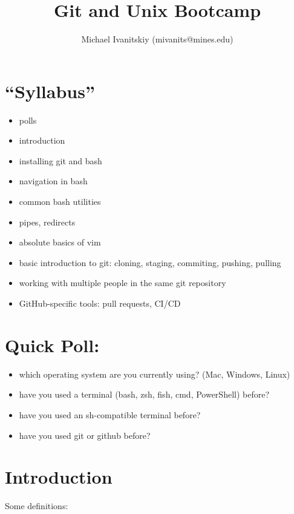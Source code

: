 \documentclass[
]{article}
\title{Git and Unix Bootcamp}
\author{Michael Ivanitskiy (mivanits@mines.edu)}
\date{}
\providecommand{\tightlist}{%
  \setlength{\itemsep}{0pt}\setlength{\parskip}{0pt}}
\begin{document}
\maketitle

\hypertarget{syllabus}{%
\section{``Syllabus''}\label{syllabus}}

\begin{itemize}
\tightlist
\item
  polls
\item
  introduction
\item
  installing git and bash
\item
  navigation in bash
\item
  common bash utilities
\item
  pipes, redirects
\item
  absolute basics of vim
\item
  basic introduction to git: cloning, staging, commiting, pushing,
  pulling
\item
  working with multiple people in the same git repository
\item
  GitHub-specific tools: pull requests, CI/CD
\end{itemize}

\hypertarget{quick-poll}{%
\section{Quick Poll:}\label{quick-poll}}

\begin{itemize}
\tightlist
\item
  which operating system are you currently using? (Mac, Windows, Linux)
\item
  have you used a terminal (bash, zsh, fish, cmd, PowerShell) before?
\item
  have you used an sh-compatible terminal before?
\item
  have you used git or github before?
\end{itemize}

\hypertarget{introduction}{%
\section{Introduction}\label{introduction}}

Some definitions:
\end{document}
